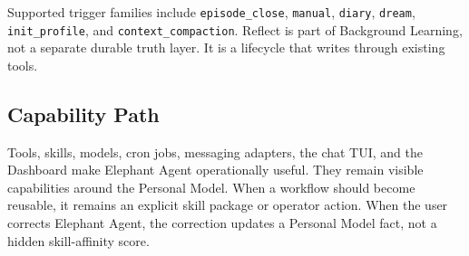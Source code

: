 Supported trigger families include \texttt{episode\_close}, \texttt{manual},
\texttt{diary}, \texttt{dream}, \texttt{init\_profile}, and
\texttt{context\_compaction}. Reflect is part of Background Learning, not a
separate durable truth layer. It is a lifecycle that writes through existing
tools.

\subsection{Capability Path}

Tools, skills, models, cron jobs, messaging adapters, the chat TUI, and the
Dashboard make Elephant Agent operationally useful. They remain visible capabilities
around the Personal Model. When a workflow should become reusable, it remains
an explicit skill package or operator action. When the user corrects Elephant Agent, the
correction updates a Personal Model fact, not a hidden skill-affinity score.
